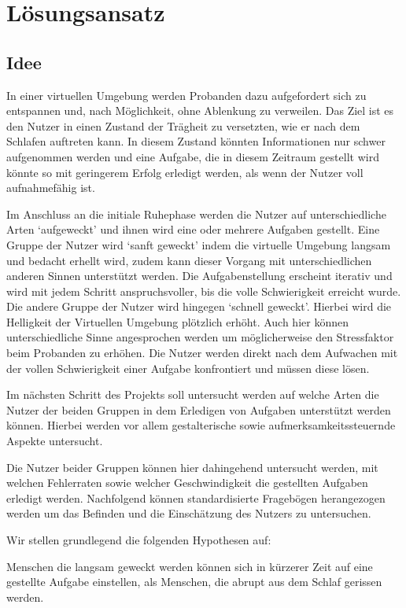 \chapter{Lösungsansatz}

\section{Idee}
In einer virtuellen Umgebung werden Probanden dazu aufgefordert sich zu entspannen und, nach Möglichkeit, ohne Ablenkung zu verweilen. Das Ziel ist es den Nutzer in einen Zustand der Trägheit zu versetzten, wie er nach dem Schlafen auftreten kann. In diesem Zustand könnten Informationen nur schwer aufgenommen werden und eine Aufgabe, die in diesem Zeitraum gestellt wird könnte so mit geringerem Erfolg erledigt werden, als wenn der Nutzer voll aufnahmefähig ist.

Im Anschluss an die initiale Ruhephase werden die Nutzer auf unterschiedliche Arten `auf\-geweckt' und ihnen wird eine oder mehrere Aufgaben gestellt. Eine Gruppe der Nutzer wird `sanft geweckt' indem die virtuelle Umgebung langsam und bedacht erhellt wird, zudem kann dieser Vorgang mit unterschiedlichen anderen Sinnen unterstützt werden. Die Aufgabenstellung erscheint iterativ und wird mit jedem Schritt anspruchsvoller, bis die volle Schwierigkeit erreicht wurde.
Die andere Gruppe der Nutzer wird hingegen `schnell geweckt'. Hierbei wird die Helligkeit der Virtuellen Umgebung plötzlich erhöht. Auch hier können unterschiedliche Sinne angesprochen werden um möglicherweise den Stressfaktor beim Probanden zu erhöhen. Die Nutzer werden direkt nach dem Aufwachen mit der vollen Schwierigkeit einer Aufgabe konfrontiert und müssen diese lösen.

Im nächsten Schritt des Projekts soll untersucht werden auf welche Arten die Nutzer der beiden Gruppen in dem Erledigen von Aufgaben unterstützt werden können. Hierbei werden vor allem gestalterische sowie aufmerksamkeitssteuernde Aspekte untersucht.

Die Nutzer beider Gruppen können hier dahingehend untersucht werden, mit welchen Fehlerraten sowie welcher Geschwindigkeit die gestellten Aufgaben erledigt werden. Nachfolgend können standardisierte Fragebögen herangezogen werden um das Befinden und die Einschätzung des Nutzers zu untersuchen.

Wir stellen grundlegend die folgenden Hypothesen auf:
\begin{hyp}\label{hyp:schneller}
	Menschen die langsam geweckt werden können sich in kürzerer Zeit auf eine gestellte Aufgabe einstellen, als Menschen, die abrupt aus dem Schlaf gerissen werden.
\end{hyp}

